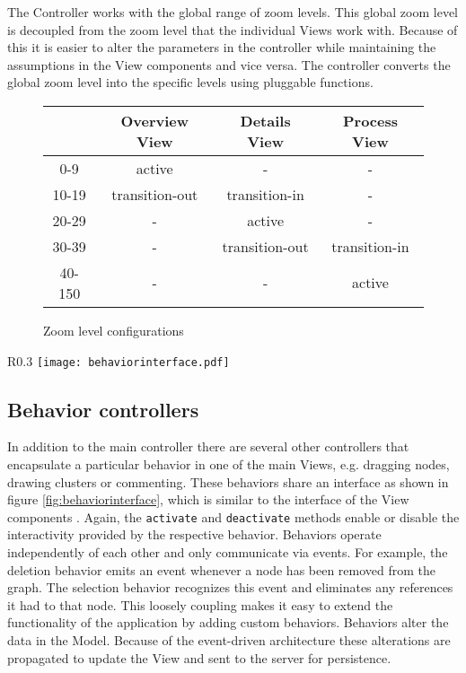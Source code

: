The Controller works with the global range of zoom levels. This global zoom level is decoupled from the zoom level that the individual Views work with. Because of this it is easier to alter the parameters in the controller while maintaining the assumptions in the View components and vice versa. The controller converts the global zoom level into the specific levels using pluggable functions.

\begin{figure}
\begin{center}
\begin{tabular}{|c|c|c|c|}
\hline
& Overview View & Details View & Process View \\ \hline
0-9 & active & - & - \\
10-19 & transition-out & transition-in & - \\
20-29 & - & active & - \\
30-39 & - & transition-out & transition-in \\
40-150 & - & - & active \\ \hline
\end{tabular}
\end{center}
\caption{Zoom level configurations}
\label{fig:zoomtable}
\end{figure}

\begin{wrapfigure}{R}{0.3\textwidth}
\texttt{[image: behaviorinterface.pdf]}
\caption{Class diagram of the Behavior interface}
\label{fig:behaviorinterface}
\end{wrapfigure}

\subsection{Behavior controllers}
\label{sec:behavior}

In addition to the main controller there are several other controllers that encapsulate a particular behavior in one of the main Views, e.g. dragging nodes, drawing clusters or commenting. These behaviors share an interface as shown in figure \ref{fig:behaviorinterface}, which is similar to the interface of the View components . Again, the \texttt{activate} and \texttt{deactivate} methods enable or disable the interactivity provided by the respective behavior. Behaviors operate independently of each other and only communicate via events. For example, the deletion behavior emits an event whenever a node has been removed from the graph. The selection behavior recognizes this event and eliminates any references it had to that node. This loosely coupling makes it easy to extend the functionality of the application by adding custom behaviors. Behaviors alter the data in the Model. Because of the event-driven architecture these alterations are propagated to update the View and sent to the server for persistence.


